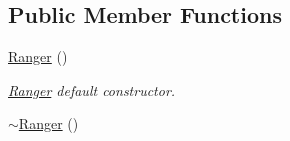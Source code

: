 \subsection*{Public Member Functions}
\begin{DoxyCompactItemize}
\item 
\hyperlink{classRanger_a65e1b9530f370b95cd673690c5bf02b5}{Ranger} ()
\begin{DoxyCompactList}\small\item\em \hyperlink{classRanger}{Ranger} default constructor. \end{DoxyCompactList}\item 
\hyperlink{classRanger_aba5e1cd17a61186c98fd026461682252}{$\sim$\+Ranger} ()\hypertarget{classRanger_aba5e1cd17a61186c98fd026461682252}{}\label{classRanger_aba5e1cd17a61186c98fd026461682252}


\end{DoxyCompactItemize}
